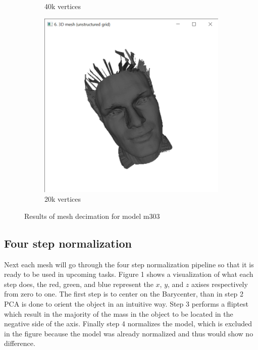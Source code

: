 \documentclass{bigdata}
\begin{document}
\begin{figure}[h!]
\begin{subfigure}[b]{0.3\linewidth}
    \caption{40k vertices}
  \end{subfigure}
  \begin{subfigure}[b]{0.3\linewidth}
    \includegraphics[width=\linewidth]{Pictures/postSub2.png}
    \caption{20k vertices}
  \end{subfigure}
  \caption{Results of mesh decimation for model m303}
  \label{fig:decimatedMesh}
\end{figure}

\subsection{Four step normalization}

Next each mesh will go through the four step normalization pipeline so that it is ready to be used in upcoming tasks. Figure 1 shows a visualization of what each step does, the red, green, and blue represent the $x$, $y$, and $z$ axises respectively from zero to one. The first step is to center on the Barycenter, than in step 2 PCA is done to orient the object in an intuitive way. Step 3 performs a fliptest which result in the majority of the mass in the object to be located in the negative side of the axis. Finally step 4 normalizes the model, which is excluded in the figure because the model was already normalized and thus would show no difference.
\end{document}

